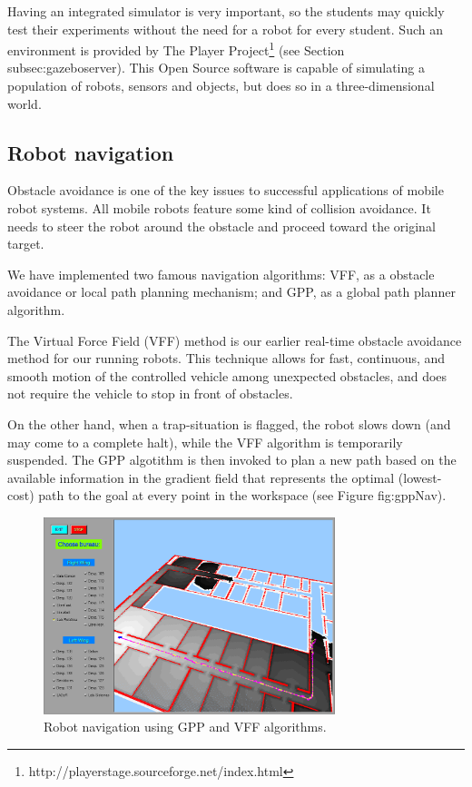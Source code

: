 \documentclass[twocolumn]{svjour3}          %
\begin{document}
Having an integrated simulator is very important, so the students may quickly test their experiments without the need for a robot for every student. Such an environment is provided by The Player Project\footnote{http://playerstage.sourceforge.net/index.html} (see Section {subsec:gazeboserver}). This Open Source software is capable of simulating a population of robots, sensors and objects, but does so in a three-dimensional world.

\subsection{Robot navigation}

Obstacle avoidance is one of the key issues to successful applications of mobile robot systems. All mobile robots feature some kind of collision avoidance. It needs to steer the robot around the obstacle and proceed toward the original target.

We have implemented two famous navigation algorithms: VFF, as a obstacle avoidance or local path planning mechanism; and GPP, as a global path planner algorithm.

The Virtual Force Field (VFF) method is our earlier real-time obstacle avoidance method for our running robots. This technique allows for fast, continuous, and smooth motion of the controlled vehicle among unexpected obstacles, and does not require the vehicle to stop in front of obstacles.

On the other hand, when a trap-situation is flagged, the robot slows down (and may come to a complete halt),
while the VFF algorithm is temporarily suspended. The GPP algotithm is then invoked to plan a new path based on the available information in the gradient field that represents the optimal (lowest-cost) path to the goal at every point in the workspace (see Figure {fig:gppNav}).

\begin{figure}[h!]
  \includegraphics[width=8.5cm]{figs/gppNav.png}
\caption{Robot navigation using GPP and VFF algorithms.}
\label{fig:gppNav}
\end{figure}
\end{document}
